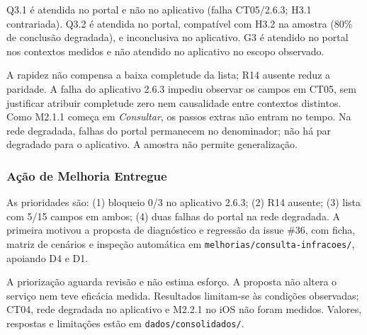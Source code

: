 Q3.1 é atendida no portal e não no aplicativo (falha CT05/2.6.3; H3.1 contrariada). Q3.2 é atendida no portal, compatível com H3.2 na amostra (80\% de conclusão degradada), e inconclusiva no aplicativo. G3 é atendido no portal nos contextos medidos e não atendido no aplicativo no escopo observado.

A rapidez não compensa a baixa completude da lista; R14 ausente reduz a paridade. A falha do aplicativo 2.6.3 impediu observar os campos em CT05, sem justificar atribuir completude zero nem causalidade entre contextos distintos. Como M2.1.1 começa em \emph{Consultar}, os passos extras não entram no tempo. Na rede degradada, falhas do portal permanecem no denominador; não há par degradado para o aplicativo. A amostra não permite generalização.

\subsubsection{Ação de Melhoria Entregue}
\label{subsec:acao-melhoria}

As prioridades são: (1) bloqueio 0/3 no aplicativo 2.6.3; (2) R14 ausente; (3) lista com 5/15 campos em ambos; (4) duas falhas do portal na rede degradada. A primeira motivou a proposta de diagnóstico e regressão da issue \#36, com ficha, matriz de cenários e inspeção automática em \texttt{melhorias/consulta-infracoes/}, apoiando D4 e D1.

A priorização aguarda revisão e não estima esforço. A proposta não altera o serviço nem teve eficácia medida. Resultados limitam-se às condições observadas; CT04, rede degradada no aplicativo e M2.2.1 no iOS não foram medidos. Valores, respostas e limitações estão em \texttt{dados/consolidados/}.
